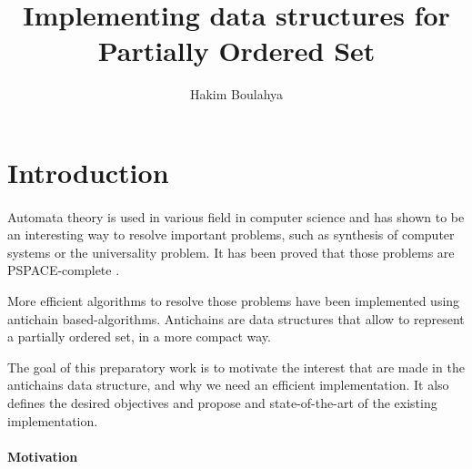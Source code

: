 \documentclass[letterpaper]{article}
\title{Implementing data structures for \\ Partially Ordered Set}
\author{Hakim Boulahya}
\begin{document}
\maketitle

\tableofcontents

\newpage

\listoftodos

\newpage

\section{Introduction}

\paragraph{}

Automata theory is used in various field in computer science and has shown
to be an interesting way to resolve important problems,
such as synthesis of computer systems
or the universality problem. It has been proved that those problems are
PSPACE-complete \cite{ant_univers}.

More efficient algorithms to resolve those problems have been implemented
using antichain based-algorithms. Antichains are data structures that allow
to represent a partially ordered set, in a more compact way.

The goal of this preparatory work is to motivate the interest that
are made in the antichains data structure, and why we need an efficient
implementation.
It also defines the desired objectives
and propose and state-of-the-art of the existing implementation.

\paragraph{Motivation}
\end{document}
